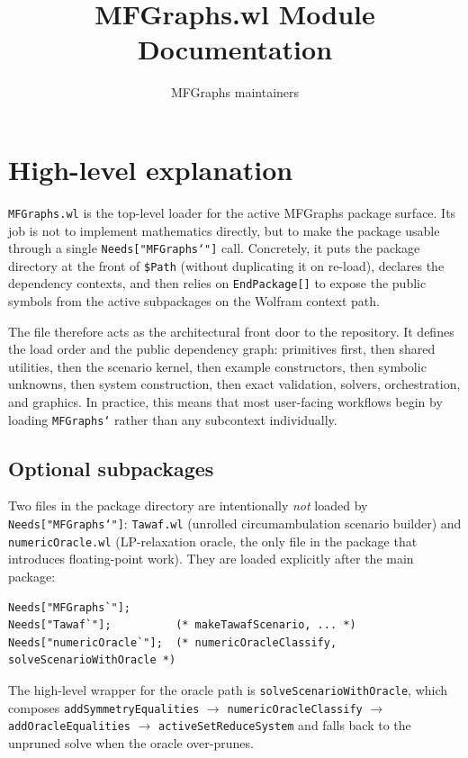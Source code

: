 \documentclass[11pt]{article}
\title{MFGraphs.wl Module Documentation}
\author{MFGraphs maintainers}
\date{}
\begin{document}
\maketitle

\section{High-level explanation}

\texttt{MFGraphs.wl} is the top-level loader for the active MFGraphs package surface. Its job is not to implement mathematics directly, but to make the package usable through a single \texttt{Needs["MFGraphs`"]} call. Concretely, it puts the package directory at the front of \texttt{\$Path} (without duplicating it on re-load), declares the dependency contexts, and then relies on \texttt{EndPackage[]} to expose the public symbols from the active subpackages on the Wolfram context path.

The file therefore acts as the architectural front door to the repository. It defines the load order and the public dependency graph: primitives first, then shared utilities, then the scenario kernel, then example constructors, then symbolic unknowns, then system construction, then exact validation, solvers, orchestration, and graphics. In practice, this means that most user-facing workflows begin by loading \texttt{MFGraphs`} rather than any subcontext individually.

\subsection*{Optional subpackages}

Two files in the package directory are intentionally \emph{not} loaded by \texttt{Needs["MFGraphs`"]}: \texttt{Tawaf.wl} (unrolled circumambulation scenario builder) and \texttt{numericOracle.wl} (LP-relaxation oracle, the only file in the package that introduces floating-point work). They are loaded explicitly after the main package:

\begin{verbatim}
Needs["MFGraphs`"];
Needs["Tawaf`"];          (* makeTawafScenario, ... *)
Needs["numericOracle`"];  (* numericOracleClassify, solveScenarioWithOracle *)
\end{verbatim}

The high-level wrapper for the oracle path is \texttt{solveScenarioWithOracle}, which composes \texttt{addSymmetryEqualities} $\to$ \texttt{numericOracleClassify} $\to$ \texttt{addOracleEqualities} $\to$ \texttt{activeSetReduceSystem} and falls back to the unpruned solve when the oracle over-prunes.
\end{document}
